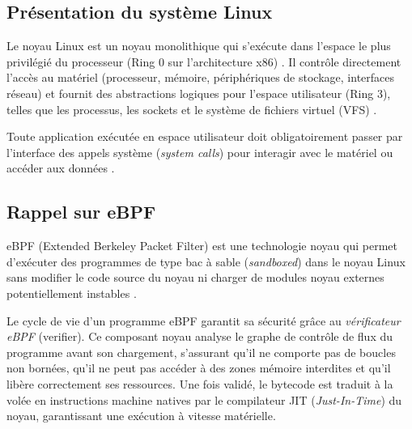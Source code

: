 \documentclass[11pt,a4paper]{article}
\begin{document}
\subsection{Présentation du système Linux}
Le noyau Linux est un noyau monolithique qui s'exécute dans l'espace le plus privilégié du processeur (Ring 0 sur l'architecture x86) \cite{billimoria}. Il contrôle directement l'accès au matériel (processeur, mémoire, périphériques de stockage, interfaces réseau) et fournit des abstractions logiques pour l'espace utilisateur (Ring 3), telles que les processus, les sockets et le système de fichiers virtuel (VFS) \cite{tlpi}.

Toute application exécutée en espace utilisateur doit obligatoirement passer par l'interface des appels système (\textit{system calls}) pour interagir avec le matériel ou accéder aux données \cite{unixadmin}.

\subsection{Rappel sur eBPF}
eBPF (Extended Berkeley Packet Filter) est une technologie noyau qui permet d'exécuter des programmes de type bac à sable (\textit{sandboxed}) dans le noyau Linux sans modifier le code source du noyau ni charger de modules noyau externes potentiellement instables \cite{learningebpf}.

Le cycle de vie d'un programme eBPF garantit sa sécurité grâce au \textit{vérificateur eBPF} (verifier). Ce composant noyau analyse le graphe de contrôle de flux du programme avant son chargement, s'assurant qu'il ne comporte pas de boucles non bornées, qu'il ne peut pas accéder à des zones mémoire interdites et qu'il libère correctement ses ressources. Une fois validé, le bytecode est traduit à la volée en instructions machine natives par le compilateur JIT (\textit{Just-In-Time}) du noyau, garantissant une exécution à vitesse matérielle.
\end{document}
